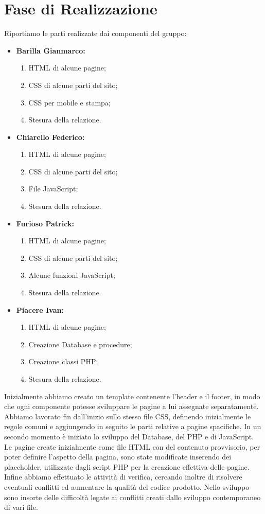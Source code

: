 \section{Fase di Realizzazione}
Riportiamo le parti realizzate dai componenti del gruppo:
\begin{itemize}
	\item \textbf{Barilla Gianmarco:}
	\begin{enumerate}
		\item HTML di alcune pagine;
		\item CSS di alcune parti del sito;
		\item CSS per mobile e stampa;
		\item Stesura della relazione.
	\end{enumerate}
	\item \textbf{Chiarello Federico:}
	\begin{enumerate}
		\item HTML di alcune pagine;
		\item CSS di alcune parti del sito;
		\item File JavaScript;
		\item Stesura della relazione.
	\end{enumerate}
	\item \textbf{Furioso Patrick:}
	\begin{enumerate}
		\item HTML di alcune pagine;
		\item CSS di alcune parti del sito;
		\item Alcune funzioni JavaScript;
		\item Stesura della relazione.
	\end{enumerate}
	\item \textbf{Piacere Ivan:}
	\begin{enumerate}
		\item HTML di alcune pagine;
		\item Creazione Database e procedure;
		\item Creazione classi PHP;
		\item Stesura della relazione.
	\end{enumerate}
\end{itemize}


Inizialmente abbiamo creato un template contenente l'header e il footer, in modo che ogni componente potesse sviluppare le pagine a lui assegnate separatamente.
Abbiamo lavorato fin dall'inizio sullo stesso file CSS, definendo inizialmente le regole comuni e aggiungendo in seguito le parti relative a pagine spacifiche.
In un secondo momento è iniziato lo sviluppo del Database, del PHP e di JavaScript.
Le pagine create inizialmente come file HTML con del contenuto provvisorio, per poter definire l'aspetto della pagina, sono state modificate inserendo dei placeholder,
utilizzate dagli script PHP per la creazione effettiva delle pagine.
Infine abbiamo effettuato le attività di verifica, cercando inoltre di risolvere eventuali conflitti ed aumentare la qualità del codice prodotto.
Nello sviluppo sono insorte delle difficoltà legate ai conflitti creati dallo sviluppo contemporaneo di vari file.
